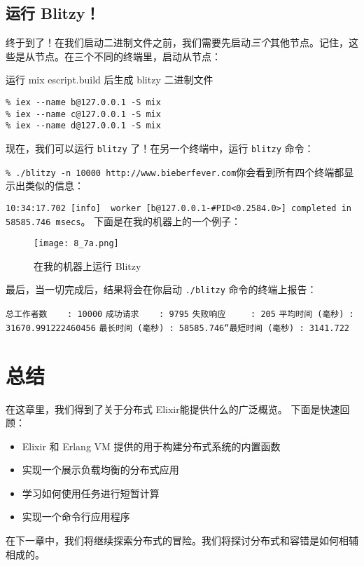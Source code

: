 \subsection{运行 Blitzy！}

终于到了！在我们启动二进制文件之前，我们需要先启动\emph{三个}其他节点。记住，这些是从节点。在三个不同的终端里，启动从节点：

\begin{code}{运行 mix escript.build 后生成 blitzy 二进制文件}
  \begin{verbatim}
% iex --name b@127.0.0.1 -S mix
% iex --name c@127.0.0.1 -S mix
% iex --name d@127.0.0.1 -S mix
\end{verbatim}
\end{code}

现在，我们可以运行 \texttt{blitzy}
了！在另一个终端中，运行 \texttt{blitzy} 命令：

\texttt{\% ./blitzy -n 10000 http://www.bieberfever.com}你会看到所有四个终端都显示出类似的信息：

\texttt{10:34:17.702 [info]  worker [b@127.0.0.1-\#PID<0.2584.0>] completed in 58585.746 msecs}。
下面是在我的机器上的一个例子：

\begin{figure}[!ht]
    \centering
    \texttt{[image: 8\_7a.png]}
    \caption{在我的机器上运行 Blitzy}
    \label{fig:8_7a}
\end{figure}


最后，当一切完成后，结果将会在你启动 \texttt{./blitzy}
命令的终端上报告：

\texttt{总工作者数    : 10000}
\texttt{成功请求    : 9795}
\texttt{失败响应     : 205}
\texttt{平均时间 (毫秒) : 31670.991222460456}
\texttt{最长时间 (毫秒) : 58585.746``最短时间 (毫秒) : 3141.722}

\section{总结}

在这章里，我们得到了关于分布式 Elixir能提供什么的广泛概览。
下面是快速回顾：

\begin{itemize}
\item  Elixir 和 Erlang VM 提供的用于构建分布式系统的内置函数
\item  实现一个展示负载均衡的分布式应用
\item  学习如何使用任务进行短暂计算
\item  实现一个命令行应用程序
\end{itemize}

在下一章中，我们将继续探索分布式的冒险。我们将探讨分布式和容错是如何相辅相成的。
